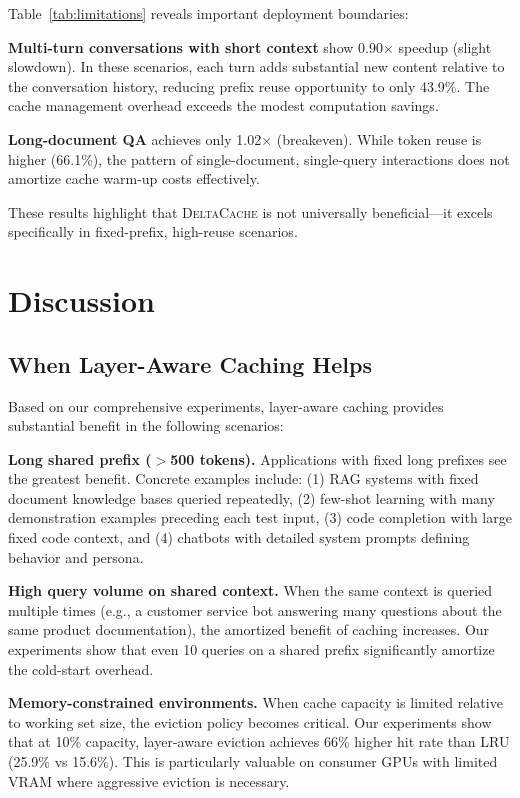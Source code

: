 \documentclass[10pt,conference]{IEEEtran}
\newcommand{\deltacache}{\textsc{DeltaCache}}
\begin{document}
Table~\ref{tab:limitations} reveals important deployment boundaries:

\textbf{Multi-turn conversations with short context} show 0.90$\times$ speedup (slight slowdown). In these scenarios, each turn adds substantial new content relative to the conversation history, reducing prefix reuse opportunity to only 43.9\%. The cache management overhead exceeds the modest computation savings.

\textbf{Long-document QA} achieves only 1.02$\times$ (breakeven). While token reuse is higher (66.1\%), the pattern of single-document, single-query interactions does not amortize cache warm-up costs effectively.

These results highlight that \deltacache{} is not universally beneficial---it excels specifically in fixed-prefix, high-reuse scenarios.

\section{Discussion}
\label{sec:discussion}

\subsection{When Layer-Aware Caching Helps}

Based on our comprehensive experiments, layer-aware caching provides substantial benefit in the following scenarios:

\textbf{Long shared prefix ($>$500 tokens).} Applications with fixed long prefixes see the greatest benefit. Concrete examples include: (1) RAG systems with fixed document knowledge bases queried repeatedly, (2) few-shot learning with many demonstration examples preceding each test input, (3) code completion with large fixed code context, and (4) chatbots with detailed system prompts defining behavior and persona.

\textbf{High query volume on shared context.} When the same context is queried multiple times (e.g., a customer service bot answering many questions about the same product documentation), the amortized benefit of caching increases. Our experiments show that even 10 queries on a shared prefix significantly amortize the cold-start overhead.

\textbf{Memory-constrained environments.} When cache capacity is limited relative to working set size, the eviction policy becomes critical. Our experiments show that at 10\% capacity, layer-aware eviction achieves 66\% higher hit rate than LRU (25.9\% vs 15.6\%). This is particularly valuable on consumer GPUs with limited VRAM where aggressive eviction is necessary.
\end{document}
